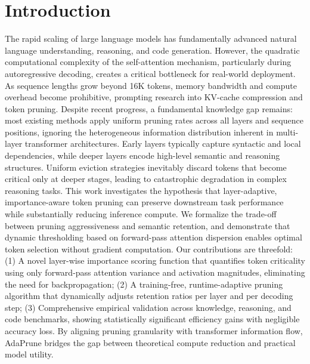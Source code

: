 \documentclass[11pt,a4paper]{article}
\begin{document}
\section{Introduction}
The rapid scaling of large language models has fundamentally advanced natural language understanding, reasoning, and code generation. However, the quadratic computational complexity of the self-attention mechanism, particularly during autoregressive decoding, creates a critical bottleneck for real-world deployment. As sequence lengths grow beyond 16K tokens, memory bandwidth and compute overhead become prohibitive, prompting research into KV-cache compression and token pruning. Despite recent progress, a fundamental knowledge gap remains: most existing methods apply uniform pruning rates across all layers and sequence positions, ignoring the heterogeneous information distribution inherent in multi-layer transformer architectures. Early layers typically capture syntactic and local dependencies, while deeper layers encode high-level semantic and reasoning structures. Uniform eviction strategies inevitably discard tokens that become critical only at deeper stages, leading to catastrophic degradation in complex reasoning tasks. This work investigates the hypothesis that layer-adaptive, importance-aware token pruning can preserve downstream task performance while substantially reducing inference compute. We formalize the trade-off between pruning aggressiveness and semantic retention, and demonstrate that dynamic thresholding based on forward-pass attention dispersion enables optimal token selection without gradient computation. Our contributions are threefold: (1) A novel layer-wise importance scoring function that quantifies token criticality using only forward-pass attention variance and activation magnitudes, eliminating the need for backpropagation; (2) A training-free, runtime-adaptive pruning algorithm that dynamically adjusts retention ratios per layer and per decoding step; (3) Comprehensive empirical validation across knowledge, reasoning, and code benchmarks, showing statistically significant efficiency gains with negligible accuracy loss. By aligning pruning granularity with transformer information flow, AdaPrune bridges the gap between theoretical compute reduction and practical model utility.
\end{document}
